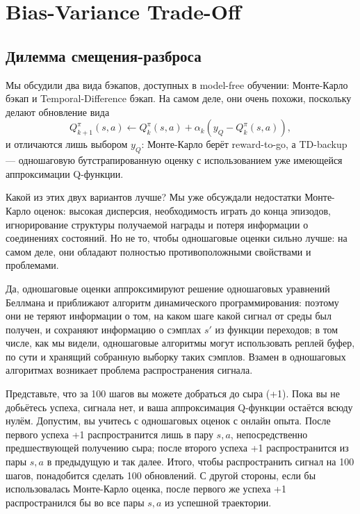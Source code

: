 \section{Bias-Variance Trade-Off}\label{sec:biasvar}

\subsection{Дилемма смещения-разброса}

Мы обсудили два вида бэкапов, доступных в model-free обучении: Монте-Карло бэкап и Temporal-Difference бэкап. На самом деле, они очень похожи, поскольку делают обновление вида
\begin{equation}\label{generalTD}
Q^\pi_{k+1}(s, a) \leftarrow Q^{\pi}_k(s, a) + \alpha_k \left( y_Q - Q^{\pi}_k(s, a) \right),
\end{equation}
и отличаются лишь выбором $y_Q$: Монте-Карло берёт reward-to-go, а TD-backup --- одношаговую бутстрапированную оценку с использованием уже имеющейся аппроксимации Q-функции.

Какой из этих двух вариантов лучше? Мы уже обсуждали недостатки Монте-Карло оценок: высокая дисперсия, необходимость играть до конца эпизодов, игнорирование структуры получаемой награды и потеря информации о соединениях состояний. Но не то, чтобы одношаговые оценки сильно лучше: на самом деле, они обладают полностью противоположными свойствами и проблемами. 

Да, одношаговые оценки аппроксимируют решение одношаговых уравнений Беллмана и приближают алгоритм динамического программирования: поэтому они не теряют информации о том, на каком шаге какой сигнал от среды был получен, и сохраняют информацию о сэмплах $s'$ из функции переходов; в том числе, как мы видели, одношаговые алгоритмы могут использовать реплей буфер, по сути и хранящий собранную выборку таких сэмплов. Взамен в одношаговых алгоритмах возникает проблема распространения сигнала.

\begin{example}
Представьте, что за 100 шагов вы можете добраться до сыра (+1). Пока вы не добьётесь успеха, сигнала нет, и ваша аппроксимация Q-функции остаётся всюду нулём. Допустим, вы учитесь с одношаговых оценок с онлайн опыта. После первого успеха +1 распространится лишь в пару $s, a$, непосредственно предшествующей получению сыра; после второго успеха +1 распространится из пары $s, a$ в предыдущую и так далее. Итого, чтобы распространить сигнал на 100 шагов, понадобится сделать 100 обновлений. С другой стороны, если бы использовалась Монте-Карло оценка, после первого же успеха +1 распространился бы во все пары $s, a$ из успешной траектории.
\end{example}

